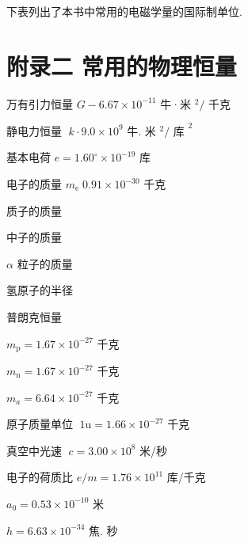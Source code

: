 \documentclass[10pt]{article}
\begin{document}
下表列出了本书中常用的电磁学量的国际制单位.

\begin{center}
\end{center}

\section*{附录二 常用的物理恒量}

万有引力恒量 \(G - {6.67} \times {10}^{-{11}}\) 牛·米 \({}^{2}/\) 千克

静电力恒量 \(\;k \cdot {9.0} \times {10}^{9}\) 牛. 米 \({}^{2}/{\text{ 库 }}^{2}\)

基本电荷 \(e = {1.60}^{ \circ } \times {10}^{-{19}}\) 库

电子的质量 \({m}_{\mathrm{e}}\;{0.91} \times {10}^{-{30}}\) 千克

质子的质量

中子的质量

\(\alpha\) 粒子的质量

氢原子的半径

普朗克恒量

\({m}_{\mathrm{p}} = {1.67} \times {10}^{-{27}}\) 千克

\({m}_{\mathrm{n}} = {1.67} \times {10}^{-{27}}\) 千克

\({m}_{a} = {6.64} \times {10}^{-{27}}\) 千克

原子质量单位 \(\;1\mathrm{u} = {1.66} \times {10}^{-{27}}\) 千克

真空中光速 \(\;c = {3.00} \times {10}^{8}\) 米/秒

电子的荷质比 \(e/m = {1.76} \times {10}^{11}\) 库/千克

\({a}_{0} = {0.53} \times {10}^{-{10}}\) 米

\(h = {6.63} \times {10}^{-{34}}\) 焦. 秒
\end{document}
